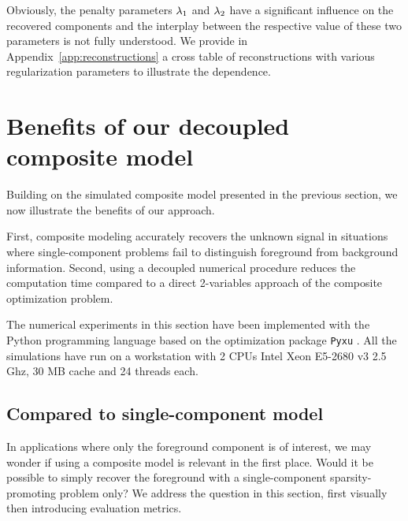         Obviously, the penalty parameters $\lambda_{1}$ and $\lambda_{2}$ have a significant influence on the recovered components and the interplay between the respective value of these two parameters is not fully understood. We provide in Appendix~\ref{app:reconstructions} a cross table of reconstructions with various regularization parameters to illustrate the dependence. 
        
\section{Benefits of our decoupled composite model}
    
    Building on the simulated composite model presented in the previous section, we now illustrate the benefits of our approach.
    
    First, composite modeling accurately recovers the unknown signal in situations where single-component problems fail to distinguish foreground from background information. Second, using a decoupled numerical procedure reduces the computation time compared to a direct 2-variables approach of the composite optimization problem.

    The numerical experiments in this section have been implemented with the Python programming language based on the optimization package \texttt{Pyxu} \cite{pyxu-framework}. All the simulations have run on a workstation with 2 CPUs Intel Xeon E5-2680 v3 \@2.5 Ghz, 30 MB cache and 24 threads each. 

    \subsection{Compared to single-component model}
    \label{sec:bene:comp}
        In applications where only the foreground component is of interest, we may wonder if using a composite model is relevant in the first place. Would it be possible to simply recover the foreground with a single-component sparsity-promoting problem only? We address the question in this section, first visually then introducing evaluation metrics.

